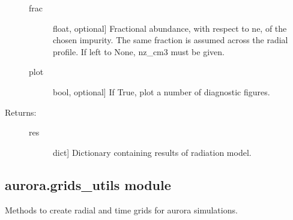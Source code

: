 \documentclass[letterpaper,10pt,english]{sphinxmanual}
\begin{document}
\begin{fulllineitems}
\begin{description}
\begin{description}
\item[{frac}] \leavevmode{[}float, optional{]}
Fractional abundance, with respect to ne, of the chosen impurity. 
The same fraction is assumed across the radial profile. If left to None,
nz\_cm3 must be given.

\item[{plot}] \leavevmode{[}bool, optional{]}
If True, plot a number of diagnostic figures.

\end{description}

\item[{Returns:}] \leavevmode\begin{description}
\item[{res}] \leavevmode{[}dict{]}
Dictionary containing results of radiation model.

\end{description}

\end{description}

\end{fulllineitems}



\subsection{aurora.grids\_utils module}
\label{\detokenize{aurora:module-aurora.grids_utils}}\label{\detokenize{aurora:aurora-grids-utils-module}}
Methods to create radial and time grids for aurora simulations.
\end{document}
